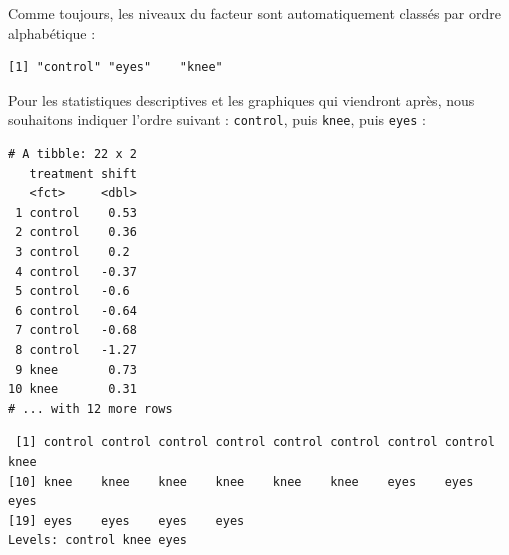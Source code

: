 \documentclass[a4paperpaper,]{article}
\newenvironment{Shaded}{\begin{snugshade}}{\end{snugshade}}
\newcommand{\DataTypeTok}[1]{\textcolor[rgb]{0.00,0.34,0.68}{#1}}
\newcommand{\KeywordTok}[1]{\textcolor[rgb]{0.12,0.11,0.11}{\textbf{#1}}}
\newcommand{\NormalTok}[1]{\textcolor[rgb]{0.12,0.11,0.11}{#1}}
\newcommand{\OperatorTok}[1]{\textcolor[rgb]{0.12,0.11,0.11}{#1}}
\newcommand{\StringTok}[1]{\textcolor[rgb]{0.75,0.01,0.01}{#1}}
\begin{document}
Comme toujours, les niveaux du facteur sont automatiquement classés par ordre alphabétique :

\begin{Shaded}
\end{Shaded}

\begin{verbatim}
[1] "control" "eyes"    "knee"   
\end{verbatim}

Pour les statistiques descriptives et les graphiques qui viendront après, nous souhaitons indiquer l'ordre suivant : \texttt{control}, puis \texttt{knee}, puis \texttt{eyes} :

\begin{Shaded}
\end{Shaded}

\begin{verbatim}
# A tibble: 22 x 2
   treatment shift
   <fct>     <dbl>
 1 control    0.53
 2 control    0.36
 3 control    0.2 
 4 control   -0.37
 5 control   -0.6 
 6 control   -0.64
 7 control   -0.68
 8 control   -1.27
 9 knee       0.73
10 knee       0.31
# ... with 12 more rows
\end{verbatim}

\begin{Shaded}
\end{Shaded}

\begin{verbatim}
 [1] control control control control control control control control knee   
[10] knee    knee    knee    knee    knee    knee    eyes    eyes    eyes   
[19] eyes    eyes    eyes    eyes   
Levels: control knee eyes
\end{verbatim}
\end{document}
